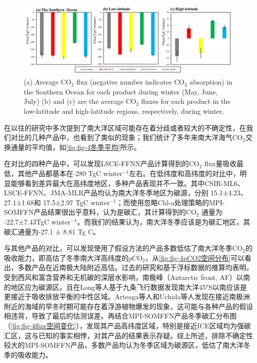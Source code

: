 \begin{figure}[htbp]
    \centering
    \includegraphics[width=\linewidth]{figure/第四章用图/图4-冬季平均.jpg}
    {(a) Average $\mathrm{CO_2}$ flux (negative number indicates $\mathrm{CO_2}$ absorption) in the Southern Ocean for each product during winter (May, June, July)  (b) and (c) are the average $\mathrm{CO_2}$ fluxes for each product in the low-latitude and high-latitude regions, respectively, during winter.}
\end{figure}
在以往的研究中多次提到了南大洋区域可能存在着分歧或者较大的不确定性，在我们对比的几种产品中，也看到了类似的现象；我们统计了多年来南大洋海气$\mathrm{CO_2}$交换通量的平均值，如\autoref{fig:fig-4冬季平均}所示。

在对比的四种产品中，可以发现LSCE-FFNN产品计算得到的$\mathrm{CO_2}$ flux量吸收最低，其他产品都基本在-280 TgC winter$^{-1}$左右。在低纬度和高纬度的对比中，明显能够看到差异最大在高纬度地区，多种产品表现并不一致。其中CSIR-ML6、LSCE-FFNN、JMA-MLR产品均认为南大洋冬季地区为碳源，分别 15.1±4.23、27.1±1.68和 17.5±2.97 TgC winter$^{-1}$；而使用忽略Chl-a处理策略的MPI-SOMFFN产品结果很出乎意料，认为是碳汇，其计算得到的$\mathrm{CO_2}$ 通量为 -22.7±7.43TgC winter$^{-1}$。而我们的结果认为，南大洋冬季应该是为碳汇地区，其碳汇通量为-27.1 ± 8.81 Tg C。

与其他产品的对比，可以发现使用了假设方法的产品多数低估了南大洋冬季$\mathrm{CO_2}$的吸收能力，即高估了冬季南大洋高纬度的$p\mathrm{CO_2}$，从\autoref{fig:fig-4pCO2空间分布}可以看出，多数产品在近南极大陆附近高估。过去的研究和基于浮标数据的推算均表明，受到西风和富含营养和无机碳的深层水影响，南极峰（Antarctic front, AF）以南的地区应为碳源区。且在Long等人\cite{long2021strong}基于九条飞行数据发现南大洋45°S以南应该是更接近于吸收排放平衡的中性区域。Arteaga等人\cite{arteaga2020seasonal}和Uchida等人\cite{uchida2019southern}发现在接近南极洲附近的海域的早冬时期可能存在着浮游植物爆发的现象，这可能与各种产品的假设相违背，导致了最后的估测误差。再结合MPI-SOMFFN产品冬季碳汇分布图（\autoref{fig:fig-4flux空间变化}），发现其产品高纬度区域，特别是接近ICE区域均为强碳汇区，这与已知的事实相悖，对其产品的结果表示存疑。综上所述，排除不确定性较大的MPI-SOMFFN产品，多数产品均认为冬季区域为碳源区，低估了南大洋冬季的吸收能力。

